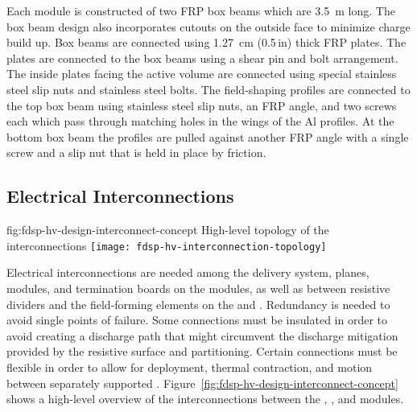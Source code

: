 Each  module is constructed of two FRP box beams which are \SI{3.5}{\m} long. The box beam design also incorporates cutouts on the outside face to minimize charge build up. Box beams are connected using \SI{1.27}{\cm} (\num{0.5}\,in) thick FRP plates. The plates are connected to the box beams using a shear pin and bolt arrangement. The inside plates facing the active volume are connected using special stainless steel slip nuts and stainless steel bolts. The field-shaping profiles are connected to the top box beam using stainless steel slip nuts, an FRP angle, and two screws each which pass through matching holes in the wings of the Al profiles. At the bottom box beam the profiles are pulled against another FRP angle with a single screw and a slip nut that is held in place by friction.



\subsection{Electrical Interconnections} %
\label{sec:fdsp-hv-design-interconnect}
\begin{dunefigure}{fig:fdsp-hv-design-interconnect-concept}
  {High-level topology of the  interconnections}
  \texttt{[image: fdsp-hv-interconnection-topology]}
\end{dunefigure}

Electrical interconnections are needed among the  delivery system,  planes,  modules, and termination
boards on the  modules, as well as between resistive dividers and
the field-forming elements on the  and .  Redundancy is
needed to avoid single points of failure. 
Some connections must be
insulated in order to avoid creating a discharge path that might
circumvent the discharge mitigation provided by the resistive 
surface and  partitioning.  Certain connections must be
flexible in order to allow for  deployment, thermal
contraction, and motion between separately supported .  Figure~\ref{fig:fdsp-hv-design-interconnect-concept} shows a high-level
overview of the interconnections between the , , and  modules.


